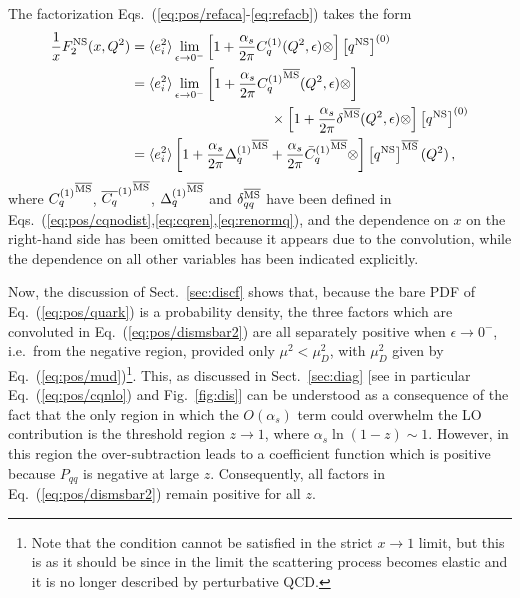 The factorization Eqs.~(\ref{eq:pos/refaca}-\ref{eq:refacb}) takes the
form
\begin{align}
  \frac{1}{x} F_2^{{\textrm{NS}}}(x,Q^2)&= \langle e_i^2\rangle
\lim_{\epsilon\to
  0^-}\left[1
    +\frac{\alpha_s}{2\pi} C_{q}^{(1)}(Q^2,\epsilon) \otimes \right] 
    \left[{q^{{\textrm{NS}}}}\right]^{(0)} \label{eq:pos/dismsbar} \\
&= \langle e_i^2\rangle
\lim_{\epsilon\to
  0^-}\left[1 +\frac{\alpha_s}{2\pi} {C_{q}^{(1)}}^{{\overline{\textrm{MS}}}}(Q^2, \epsilon) \otimes \right]
  \nonumber\\
  &\qquad\qquad\qquad\qquad\qquad
    \times\left[1 +\frac{\alpha_s}{2\pi} \delta^{{\overline{\textrm{MS}}}} (Q^2,\epsilon) \otimes \right]
     \left[{q^{{\textrm{NS}}}}\right]^{(0)} \label{eq:pos/dismsbar1} \\
    &=  \langle e_i^2\rangle
\left[1+ \frac{\alpha_s}{2\pi} {\Delta^{(1)}_q}^{{\overline{\textrm{MS}}}}
  +\frac{\alpha_s}{2\pi}    {\bar{C}_{q}^{(1)}{}}^{{\overline{\textrm{MS}}}} \otimes
  \right] 
     \left[{q^{{\textrm{NS}}}}\right]^{{\overline{\textrm{MS}}}}(Q^2) \,, \label{eq:pos/dismsbar2}
\end{align}
where $ {C_{q}^{(1)}}^{{\overline{\textrm{MS}}}}$,  ${\overline{C_{q}}^{(1)}}^{{\overline{\textrm{MS}}}}$,
${\Delta^{(1)}_q}^{{\overline{\textrm{MS}}}}$ and $ \delta_{qq}^{{\overline{\textrm{MS}}}} $ have been
defined in Eqs.~(\ref{eq:pos/cqnodist},\ref{eq:cqren},\ref{eq:renormq}),
and the dependence on $x$ on the  right-hand side has been omitted
because it appears due to the convolution, while the dependence on all
other variables has been indicated explicitly.

Now, the discussion of Sect.~\ref{sec:discf} shows that, because the
bare PDF of Eq.~(\ref{eq:pos/quark}) is a probability density, the three
factors which are convoluted in Eq.~(\ref{eq:pos/dismsbar2}) are all
separately positive when $\epsilon \to 0^-$, i.e.\ from the negative
region, provided only $\mu^2< \mu_D^2$, with $\mu_D^2$ given by
Eq.~(\ref{eq:pos/mud})\footnote{Note that the condition cannot be satisfied in
the strict $x\to1$ limit, but this is as it should be since in the
limit the scattering process becomes elastic and it is no longer
described by perturbative QCD.}.
This, as discussed in Sect.~\ref{sec:diag} [see in particular
Eq.~(\ref{eq:pos/cqnlo}) and Fig.~\ref{fig:dis}]
can be understood as a consequence of the fact that the only region in
which the $O(\alpha_s)$ term could overwhelm the LO contribution is
the threshold region $z\to 1$, where $\alpha_s\ln(1-z)\sim1$.
However, in this region the \msbar{} over-subtraction leads to a
coefficient function which is positive because $P_{qq}$ is negative at
large $z$. Consequently, all factors in  Eq.~(\ref{eq:pos/dismsbar2})
remain positive for all $z$.

